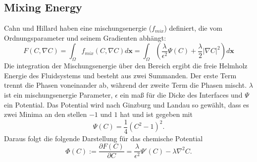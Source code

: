 \subsection{Mixing Energy}
Cahn und Hillard haben eine mischungsenergie ($f_{mix}$) definiert, die vom Ordnungsparameter und seinem Gradienten abhängt:
\begin{equation}
    F(C, \nabla C) = \int_{\Omega} f_{mix} (C, \nabla C) d\textbf{x} = \int_{\Omega}\left(\frac{\lambda}{\epsilon^2}\Psi(C)+\frac{\lambda}{2}\vert\nabla C\vert^2\right)d\textbf{x}
\end{equation}
Die integration der Mischungsenergie über den Bereich ergibt die freie Helmholz Energie des Fluidsystems und besteht aus zwei Summanden. Der erste Term trennt die Phasen voneinander ab, während der zweite Term die Phasen mischt. $\lambda$ ist ein mischungsenergie Parameter, $\epsilon$ ein maß für die Dicke des Interfaces und $\Psi$ ein Potential. Das Potential wird nach Ginzburg und Landau so gewählt, dass es zwei Minima an den stellen $-1$ und $1$ hat und ist gegeben mit 
\begin{equation}
    \Psi(C)= \frac{1}{4}\left(C^2-1\right)^2.
\end{equation}
Daraus folgt die folgende Darstellung für das chemische Potential 
\begin{equation}
    \label{eq: chempotentialMIXING_pahseFieldMethod}
    \Phi(C):= \frac{\partial F(C)}{\partial C} = \frac{\lambda}{\epsilon^2}\Psi'(C)-\lambda\nabla^2C.
\end{equation}


